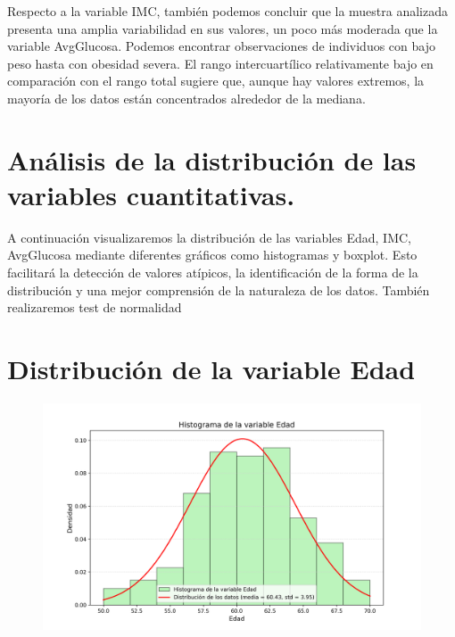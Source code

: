 \documentclass[a4paper, 12pt]{article}
\begin{document}
Respecto a la variable IMC, también podemos concluir que la muestra analizada presenta una amplia variabilidad en sus valores, un poco más moderada que la variable AvgGlucosa. Podemos encontrar observaciones 
de individuos con bajo peso hasta con obesidad severa. El rango intercuartílico relativamente bajo en comparación 
con el rango total sugiere que, aunque hay valores extremos, la mayoría de los datos están concentrados alrededor de la 
mediana.




\newpage



\section{Análisis de la distribución de las variables cuantitativas.}
A continuación visualizaremos la distribución de las variables Edad, IMC, AvgGlucosa mediante diferentes gráficos como histogramas y boxplot.
Esto facilitará la detección de valores atípicos, la identificación de la forma de la distribución y una mejor comprensión de la naturaleza 
de los datos. También realizaremos test de normalidad


\section{Distribución de la variable Edad}
\vspace {-0.8cm}
\begin{figure}[H]
    \centering
    \includegraphics[width=1\textwidth]{img/Histogramas/Histograma_Edad.png}
\end{figure}
\end{document}
